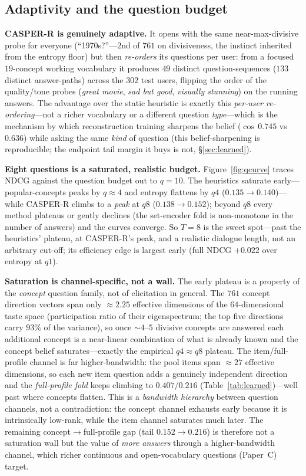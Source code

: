 \documentclass[11pt]{article}
\begin{document}
\subsection{Adaptivity and the question budget}\label{sec:adapt}
\textbf{CASPER-R is genuinely adaptive.} It opens with the same near-max-divisive probe for everyone (``1970s?''---$2$nd
of $761$ on divisiveness, the instinct inherited from the entropy floor) but then \emph{re-orders} its questions per
user: from a focused $19$-concept working vocabulary it produces $49$ distinct question-sequences ($133$ distinct
answer-paths) across the $302$ test users, flipping the order of the quality/tone probes (\emph{great movie},
\emph{sad but good}, \emph{visually stunning}) on the running answers. The advantage over the static heuristic is exactly
this \emph{per-user re-ordering}---not a richer vocabulary or a different question \emph{type}---which is the mechanism by
which reconstruction training sharpens the belief ($\cos\,0.745$ vs $0.636$) while asking the same \emph{kind} of
question (this belief-sharpening is reproducible; the endpoint tail margin it buys is not, \S\ref{sec:learned}).

\textbf{Eight questions is a saturated, realistic budget.} Figure~\ref{fig:qcurve} traces NDCG against the question
budget out to $q{=}10$. The heuristics saturate early---popular-concepts peaks by $q{\approx}4$ and entropy flattens by
$q4$ ($0.135{\to}0.140$)---while CASPER-R climbs to a \emph{peak} at $q8$ ($0.138{\to}0.152$); beyond $q8$ every method
plateaus or gently declines (the set-encoder fold is non-monotone in the number of answers) and the curves converge. So
$T{=}8$ is the sweet spot---past the heuristics' plateau, at CASPER-R's peak, and a realistic dialogue length, not an
arbitrary cut-off; its efficiency edge is largest early (full NDCG $+0.022$ over entropy at $q1$).

\textbf{Saturation is channel-specific, not a wall.} The early plateau is a property of the \emph{concept} question
family, not of elicitation in general. The $761$ concept direction vectors span only $\approx2.25$ effective dimensions
of the $64$-dimensional taste space (participation ratio of their eigenspectrum; the top five directions carry $93\%$ of
the variance), so once $\sim\!4$--$5$ divisive concepts are answered each additional concept is a near-linear combination
of what is already known and the concept belief saturates---exactly the empirical $q4\!\approx\!q8$ plateau. The
item/full-profile channel is far higher-bandwidth: the pool items span $\approx27$ effective dimensions, so each new item
question adds a genuinely independent direction and the \emph{full-profile fold} keeps climbing to $0.407/0.216$
(Table~\ref{tab:learned})---well past where concepts flatten. This is a \emph{bandwidth hierarchy} between question
channels, not a contradiction: the concept channel exhausts early because it is intrinsically low-rank, while the item
channel saturates much later. The remaining concept$\to$full-profile gap (tail $0.152{\to}0.216$) is therefore not a
saturation wall but the value of \emph{more answers} through a higher-bandwidth channel, which richer continuous and
open-vocabulary questions (Paper~C) target.
\end{document}
